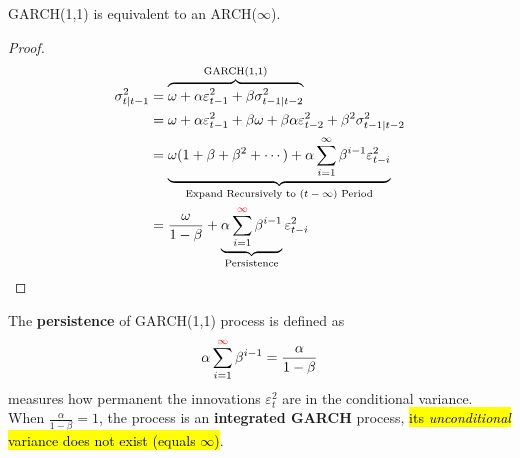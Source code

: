 \documentclass[11pt]{article}
\begin{document}
            \begin{proposition}
                GARCH(1,1) is equivalent to an ARCH($\infty$).
                \begin{proof}
                    \begin{align}
                        \sigma_{t|t-1}^2 &= \overbrace{\omega + \alpha \varepsilon_{t-1}^2 + \beta \sigma_{t-1|t-2}^2}^{\text{{GARCH(1,1)}}} \\
                        &= \omega + \alpha \varepsilon_{t-1}^2 + \beta \omega + \beta \alpha \varepsilon_{t-2}^2 + \beta^2 \sigma_{t-1|t-2}^2 \\
                        &= \underbrace{\omega(1 + \beta + \beta^2 + \cdots) + \alpha \sum_{i=1}^\infty \beta^{i-1} \varepsilon_{t-i}^2}_{\text{{Expand Recursively to $(t-\infty)$ Period}}} \\
                        &= \frac{\omega}{1 - \beta} + \underbrace{\alpha \sum_{i=1}^{\textcolor{red}{\infty}} \beta^{i-1}}_{\text{{Persistence}}} \varepsilon_{t-i}^2
                    \end{align}
                \end{proof}
            \end{proposition}
            
            \begin{definition}
                The \textbf{persistence} of GARCH(1,1) process is defined as
                \begin{equation}
                    \alpha \sum_{i=1}^{\textcolor{red}{\infty}} \beta^{i-1} = \frac{\alpha}{1 - \beta}
                \end{equation}
                measures how permanent the innovations $\varepsilon_t^2$ are in the conditional variance. When $\frac{\alpha}{1 - \beta} = 1$, the process is an \textbf{integrated GARCH} process, \hl{its \emph{unconditional} variance does not exist (equals $\infty$)}.
            \end{definition}
	        
\end{document}
